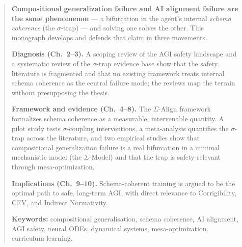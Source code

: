 \begin{abstract}
\noindent\textbf{Compositional generalization failure and AI alignment failure are the same phenomenon}
— a bifurcation in the agent's internal \emph{schema coherence} (the $\sigma$-trap) — and solving one
solves the other. This monograph develops and defends that claim in three movements.

\textbf{Diagnosis (Ch.~2--3).} A scoping review of the AGI safety landscape and a systematic review of the
$\sigma$-trap evidence base show that the safety literature is fragmented and that no existing framework
treats internal schema coherence as the central failure mode; the reviews map the terrain without
presupposing the thesis.

\textbf{Framework and evidence (Ch.~4--8).} The $\Sigma$-Align framework formalizes schema coherence as
a measurable, intervenable quantity. A pilot study tests $\sigma$-coupling interventions, a meta-analysis
quantifies the $\sigma$-trap across the literature, and two empirical studies show that compositional
generalization failure is a real bifurcation in a minimal mechanistic model (the $\Sigma$-Model) and that
the trap is safety-relevant through mesa-optimization.

\textbf{Implications (Ch.~9--10).} Schema-coherent training is argued to be the optimal path to safe,
long-term AGI, with direct relevance to Corrigibility, CEV, and Indirect Normativity.

\textbf{Keywords:} compositional generalisation, schema coherence, AI alignment, AGI safety, neural ODEs,
dynamical systems, mesa-optimization, curriculum learning.
\end{abstract}
